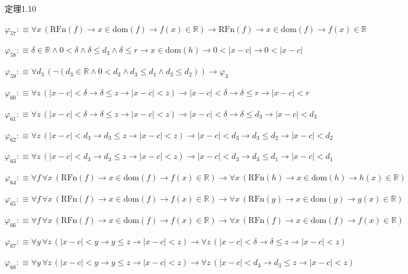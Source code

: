 \begin{fullproof}{定理1.10}
\begin{abbrevlist}
\item $\varphi_{57} :\equiv \forall x\,(\mathrm{RFn}(f) \to x \in \mathrm{dom}(f) \to f(x) \in \mathbb{R}) \to \mathrm{RFn}(f) \to x \in \mathrm{dom}(f) \to f(x) \in \mathbb{R}$
\item $\varphi_{58} :\equiv \delta \in \mathbb{R} \land 0 < \delta \land \delta \leq d_{3} \land \delta \leq r \to x \in \mathrm{dom}(h) \to 0 < \lvert x - c \rvert \to 0 < \lvert x - c \rvert$
\item $\varphi_{59} :\equiv \forall d_{3}\,(\neg (d_{3} \in \mathbb{R} \land 0 < d_{3} \land d_{3} \leq d_{1} \land d_{3} \leq d_{2})) \to \varphi_{3}$
\item $\varphi_{60} :\equiv \forall z\,(\lvert x - c \rvert < \delta \to \delta \leq z \to \lvert x - c \rvert < z) \to \lvert x - c \rvert < \delta \to \delta \leq r \to \lvert x - c \rvert < r$
\item $\varphi_{61} :\equiv \forall z\,(\lvert x - c \rvert < \delta \to \delta \leq z \to \lvert x - c \rvert < z) \to \lvert x - c \rvert < \delta \to \delta \leq d_{3} \to \lvert x - c \rvert < d_{3}$
\item $\varphi_{62} :\equiv \forall z\,(\lvert x - c \rvert < d_{3} \to d_{3} \leq z \to \lvert x - c \rvert < z) \to \lvert x - c \rvert < d_{3} \to d_{3} \leq d_{2} \to \lvert x - c \rvert < d_{2}$
\item $\varphi_{63} :\equiv \forall z\,(\lvert x - c \rvert < d_{3} \to d_{3} \leq z \to \lvert x - c \rvert < z) \to \lvert x - c \rvert < d_{3} \to d_{3} \leq d_{1} \to \lvert x - c \rvert < d_{1}$
\item $\varphi_{64} :\equiv \forall f\,\forall x\,(\mathrm{RFn}(f) \to x \in \mathrm{dom}(f) \to f(x) \in \mathbb{R}) \to \forall x\,(\mathrm{RFn}(h) \to x \in \mathrm{dom}(h) \to h(x) \in \mathbb{R})$
\item $\varphi_{65} :\equiv \forall f\,\forall x\,(\mathrm{RFn}(f) \to x \in \mathrm{dom}(f) \to f(x) \in \mathbb{R}) \to \forall x\,(\mathrm{RFn}(g) \to x \in \mathrm{dom}(g) \to g(x) \in \mathbb{R})$
\item $\varphi_{66} :\equiv \forall f\,\forall x\,(\mathrm{RFn}(f) \to x \in \mathrm{dom}(f) \to f(x) \in \mathbb{R}) \to \forall x\,(\mathrm{RFn}(f) \to x \in \mathrm{dom}(f) \to f(x) \in \mathbb{R})$
\item $\varphi_{67} :\equiv \forall y\,\forall z\,(\lvert x - c \rvert < y \to y \leq z \to \lvert x - c \rvert < z) \to \forall z\,(\lvert x - c \rvert < \delta \to \delta \leq z \to \lvert x - c \rvert < z)$
\item $\varphi_{68} :\equiv \forall y\,\forall z\,(\lvert x - c \rvert < y \to y \leq z \to \lvert x - c \rvert < z) \to \forall z\,(\lvert x - c \rvert < d_{3} \to d_{3} \leq z \to \lvert x - c \rvert < z)$

\end{abbrevlist}
\end{fullproof}
